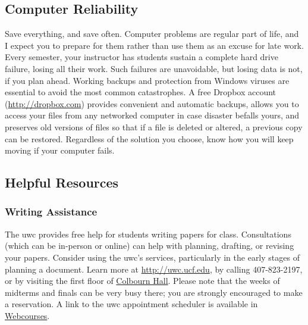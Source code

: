 \documentclass[11pt,oneside]{amsart}	%
\begin{document}
\subsection{Computer Reliability}\label{sub:reliability}
Save everything, and save often.  Computer problems are regular part of life, and I expect you to prepare for them rather than use them as an excuse for late work. Every semester, your instructor has students sustain a complete hard drive failure, losing all their work. Such failures are unavoidable, but losing data is not, if you plan ahead. Working backups and protection from Windows viruses are essential to avoid the most common catastrophes.  A free Dropbox account (\href{http://db.tt/mzWxY8s}{http://dropbox.com}) provides convenient and automatic backups, allows you to access your files from any networked computer in case disaster befalls yours, and preserves old versions of files so that if a file is deleted or altered, a previous copy can be restored. Regardless of the solution you choose, know how you will keep moving if your computer fails.

\subsection{Helpful Resources} %
\label{sub:helpful_resources}
\subsubsection{Writing Assistance}\label{ssub:uwc}
The \ac{uwc} provides free help for students writing papers for class.  Consultations (which can be in-person or online) can help with planning, drafting, or revising your papers.  Consider using the \ac{uwc}'s services, particularly in the early stages of planning a document.  Learn more at \href{http://uwc.ucf.edu/}{http://uwc.ucf.edu}, by calling 407-823-2197, or by visiting the first floor of \href{https://www.map.ucf.edu/locations/18/colbourn-hall/}{Colbourn Hall}.  Please note that the weeks of midterms and finals can be very busy there; you are strongly encouraged to make a reservation. A link to the \ac{uwc} appointment scheduler is available in \href{http://webcourses.instructure.com}{Webcourses}.

\begin{comment}	%
	\subsubsection{Research Assistance} %
	\label{ssub:knowledge_commons_in_the_library_}
	Located halfway back on the main floor of the main campus library and online via \href{http://library.ucf.edu/Ask/}{Ask a Librarian}, the Knowledge Commons houses very smart, very helpful, and surprisingly friendly research assistants. They know more about the library and its collections than anyone else, and they love showing off what they know. They also don't like losing to a challenge. If you have trouble finding a particular resource or are stuck and need to find another direction to go with your thinking, they should be the first folks you talk to.
\end{comment}
\end{document}
